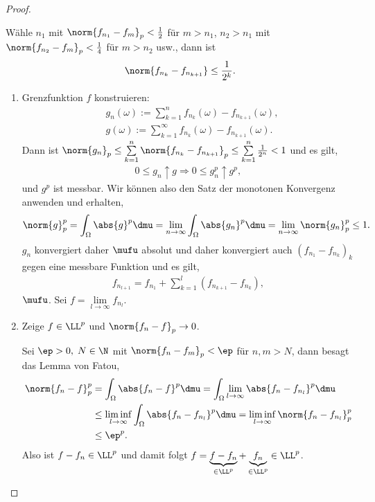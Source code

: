 \begin{proof}
\begin{enumerate}[label=\arabic{*}.)]
Wähle $n_1$ mit $\norm{f_{n_1}-f_m}_p < \frac{1}{2}$ für $m>n_1$, $n_2> n_1$
mit $\norm{f_{n_2}-f_m}_p < \frac{1}{4}$ für $m>n_2$ usw., dann ist
\begin{align*}
\norm{f_{n_k}-f_{n_{k+1}}} \le \frac{1}{2^{k}}.
\end{align*}
\begin{enumerate}[label=(\alph{*})]
  \item Grenzfunktion $f$ konstruieren:
\begin{align*}
&g_n(\omega) := \sum\limits_{k=1}^n f_{n_k}(\omega) -
f_{n_{k+1}}(\omega),\\
&g(\omega) := \sum\limits_{k=1}^\infty
f_{n_k}(\omega)-f_{n_{k+1}}(\omega).
\end{align*}
Dann ist $\norm{g_n}_p \le \sum\limits_{k=1}^n \norm{f_{n_k} -
f_{n_{k+1}}}_p \le \sum\limits_{k=1}^n \frac{1}{2^n}< 1$ und es gilt,
\begin{align*}
0\le g_n \uparrow g \Rightarrow 0\le g_n^p \uparrow g^p,
\end{align*}
und $g^p$ ist messbar. Wir können also den Satz der monotonen Konvergenz
anwenden und erhalten,
\begin{align*}
\norm{g}_p^p = \int_\Omega \abs{g}^p \dmu =  \lim\limits_{n\to\infty}
\int_\Omega \abs{g_n}^p \dmu =  \lim\limits_{n\to\infty} \norm{g_n}_p^p \le 1.
\end{align*}
$g_n$ konvergiert daher $\mufu$ absolut und daher konvergiert auch
$(f_{n_1}-f_{n_k})_k$ gegen eine messbare Funktion und es gilt,
\begin{align*}
f_{n_{l+1}} = f_{n_1} + \sum\limits_{k=1}^l (f_{n_{k+1}}-f_{n_k}),
\end{align*}
$\mufu$. Sei $f = \lim\limits_{l\to\infty} f_{n_l}$. 
\item Zeige $f\in\LL^p$ und $\norm{f_n-f}_p \to 0$.

Sei $\ep > 0,\;N\in\N$ mit $\norm{f_{n} - f_{m}}_p < \ep$ für $n,m >N$,
dann besagt das Lemma von Fatou,
\begin{align*}
\norm{f_n-f}_p^p &= \int_\Omega \abs{f_n -f}^p \dmu
 = \int_\Omega \lim\limits_{l\to\infty} \abs{f_n-f_{n_l}}^p\dmu
\\ &\le \liminf_{l\to\infty} \int_\Omega \abs{f_n-f_{n_l}}^p\dmu
=  \liminf_{l\to\infty} \norm{f_n-f_{n_l}}_p^p  \\
 &\le \ep^p.
\end{align*}
Also ist $f-f_n\in\LL^p$ und damit folgt $f = \underbrace{f-f_n}_{\in\LL^p} +
\underbrace{f_n}_{\in\LL^p}\in\LL^p$.\qedhere
\end{enumerate}
\end{enumerate}
\end{proof}

